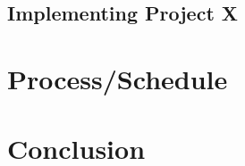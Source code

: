 \documentclass{article}
\begin{document}

\subsection*{Implementing Project X}



\section*{Process/Schedule}

\section*{Conclusion}




\end{document}

